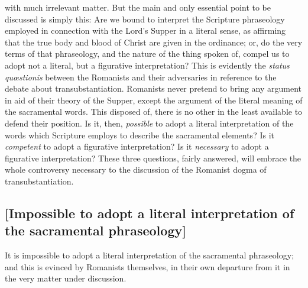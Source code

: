 \documentclass[
]{book}
\begin{document}
with much irrelevant matter. But the main and only essential point to be discussed is simply this: Are we bound to interpret the Scripture phraseology employed in connection with the Lord's Supper in a literal sense, as affirming that the true body and blood of Christ are given in the ordinance; or, do the very terms of that phraseology, and the nature of the thing spoken of, compel us to adopt not a literal, but a figurative interpretation? This is evidently the \foreignlanguage{latin}{\emph{status quœstionis}} between the Romanists and their adversaries in reference to the debate about transubstantiation. Romanists never pretend to bring any argument in aid of their theory of the Supper, except the argument of the literal meaning of the sacramental words. This disposed of, there is no other in the least available to defend their position. Is it, then, \emph{possible} to adopt a literal interpretation of the words which Scripture employs to describe the sacramental elements? Is it \emph{competent} to adopt a figurative interpretation? Is it \emph{necessary} to adopt a figurative interpretation? These three questions, fairly answered, will embrace the whole controversy necessary to the discussion of the Romanist dogma of transubstantiation.

\hypertarget{impossible-to-adopt-a-literal-interpretation-of-the-sacramental-phraseology}{%
\subsection{{[}Impossible to adopt a literal interpretation of the sacramental phraseology{]}}\label{impossible-to-adopt-a-literal-interpretation-of-the-sacramental-phraseology}}

It is impossible to adopt a literal interpretation of the sacramental phraseology; and this is evinced by Romanists themselves, in their own departure from it in the very matter under discussion.
\end{document}
